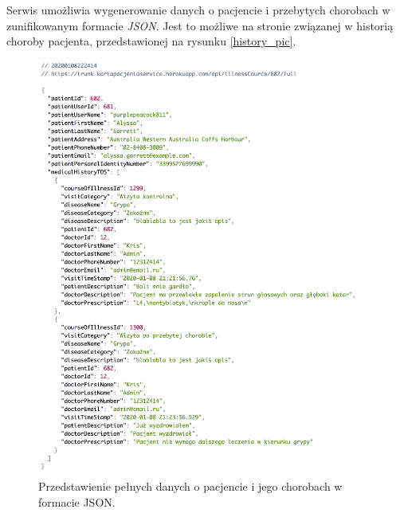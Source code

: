 Serwis umożliwia wygenerowanie danych o pacjencie i przebytych chorobach w zunifikowanym formacie \textit{JSON}. Jest to możliwe na stronie związanej w historią choroby pacjenta, przedstawionej na rysunku \ref{history_pic}.
\begin{figure}[H]
\centering
\includegraphics[width=15cm]{pictures/service/07-json_normal}
\caption{Przedstawienie pełnych danych o pacjencie i jego chorobach w formacie JSON.}
\end{figure}

